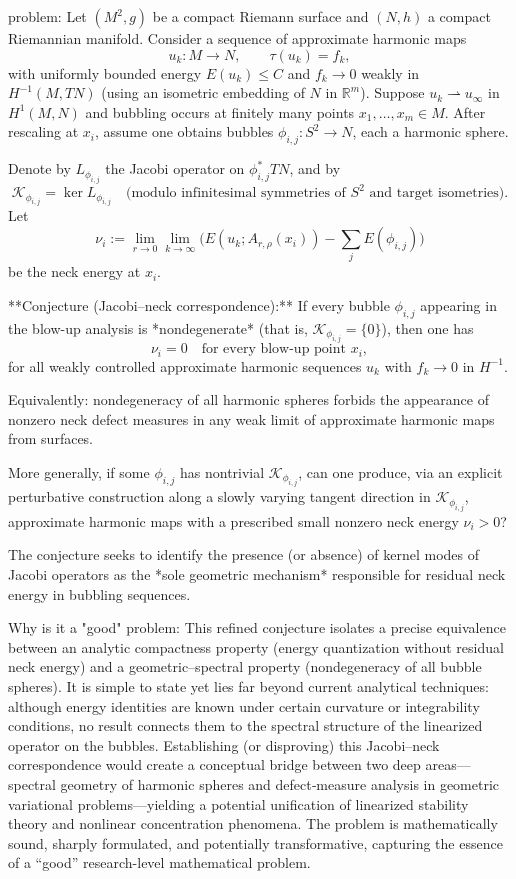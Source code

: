 problem:  
Let \( (M^2,g) \) be a compact Riemann surface and \( (N,h) \) a compact Riemannian manifold.  Consider a sequence of approximate harmonic maps  
\[
u_k:M\to N,\qquad \tau(u_k)=f_k,
\]
with uniformly bounded energy \(E(u_k)\le C\) and \(f_k\to0\) weakly in \(H^{-1}(M,TN)\) (using an isometric embedding of \(N\) in \(\mathbb{R}^m\)).  
Suppose \(u_k\rightharpoonup u_\infty\) in \(H^1(M,N)\) and bubbling occurs at finitely many points \(x_1,\ldots,x_m\in M\).  
After rescaling at \(x_i\), assume one obtains bubbles \(\phi_{i,j}:S^2\to N\), each a harmonic sphere.

Denote by \(L_{\phi_{i,j}}\) the Jacobi operator on \(\phi_{i,j}^*TN\), and by
\[
\mathcal K_{\phi_{i,j}} = \ker L_{\phi_{i,j}}\quad\text{(modulo infinitesimal symmetries of \(S^2\) and target isometries)}.
\]
Let 
\[
\nu_i := \lim_{r\to0}\lim_{k\to\infty}\Big(E(u_k;A_{r,\rho}(x_i)) - \sum_j E(\phi_{i,j})\Big)
\]
be the neck energy at \(x_i\).

**Conjecture (Jacobi–neck correspondence):**  
If every bubble \(\phi_{i,j}\) appearing in the blow-up analysis is *nondegenerate* (that is, \(\mathcal K_{\phi_{i,j}} = \{0\}\)), then one has
\[
\nu_i = 0 \quad \text{for every blow-up point } x_i,
\]
for all weakly controlled approximate harmonic sequences \(u_k\) with \(f_k \to 0\) in \(H^{-1}\).

Equivalently: nondegeneracy of all harmonic spheres forbids the appearance of nonzero neck defect measures in any weak limit of approximate harmonic maps from surfaces.

More generally, if some \(\phi_{i,j}\) has nontrivial \(\mathcal K_{\phi_{i,j}}\), can one produce, via an explicit perturbative construction along a slowly varying tangent direction in \(\mathcal K_{\phi_{i,j}}\), approximate harmonic maps with a prescribed small nonzero neck energy \(\nu_i>0\)?  

The conjecture seeks to identify the presence (or absence) of kernel modes of Jacobi operators as the *sole geometric mechanism* responsible for residual neck energy in bubbling sequences.

Why is it a "good" problem:  
This refined conjecture isolates a precise equivalence between an analytic compactness property (energy quantization without residual neck energy) and a geometric–spectral property (nondegeneracy of all bubble spheres).  It is simple to state yet lies far beyond current analytical techniques: although energy identities are known under certain curvature or integrability conditions, no result connects them to the spectral structure of the linearized operator on the bubbles.  
Establishing (or disproving) this Jacobi–neck correspondence would create a conceptual bridge between two deep areas—spectral geometry of harmonic spheres and defect‑measure analysis in geometric variational problems—yielding a potential unification of linearized stability theory and nonlinear concentration phenomena.  The problem is mathematically sound, sharply formulated, and potentially transformative, capturing the essence of a “good” research-level mathematical problem.